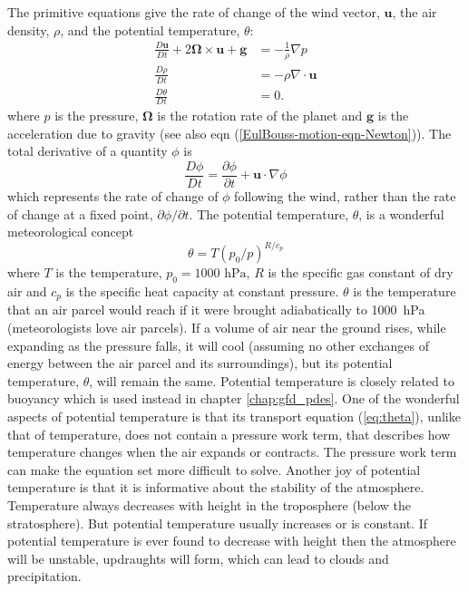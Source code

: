 The primitive equations give the rate of change of the wind vector,
$\mathbf{u}$, the air density, $\rho$, and the potential temperature,
$\theta$:
\begin{align}
\frac{D\mathbf{u}}{Dt}+2\bm{\Omega}\times\mathbf{u}+\mathbf{g} & =-\frac{1}{\rho}\nabla p\label{eq:mom}\\
\frac{D\rho}{Dt} & =-\rho\nabla\cdot\mathbf{u}\label{eq:cont}\\
\frac{D\theta}{Dt} & =0.\label{eq:theta}
\end{align}
where $p$ is the pressure, $\bm{\Omega}$ is the rotation rate of
the planet and $\mathbf{g}$ is the acceleration due to gravity (see also eqn (\ref{EulBouss-motion-eqn-Newton})).
The total derivative of a quantity $\phi$ is
\begin{equation}
\frac{D\phi}{Dt}=\frac{\partial\phi}{\partial t}+\mathbf{u}\cdot\nabla\phi\label{eq:linAdvect}
\end{equation}
which represents the rate of change of $\phi$ following the wind,
rather than the rate of change at a fixed point, $\partial\phi/\partial t$.
The potential temperature, $\theta$, is a wonderful meteorological
concept
\begin{equation}
\theta=T\left(p_{0}/p\right)^{R/c_{p}}
\end{equation}
where $T$ is the temperature, $p_{0}=1000\text{ hPa}$, $R$ is the
specific gas constant of dry air and $c_{p}$ is the specific heat
capacity at constant pressure. $\theta$ is the temperature that an
air parcel would reach if it were brought adiabatically to 1000~hPa
(meteorologists love air parcels). If a volume of air near the ground
rises, while expanding as the pressure falls, it will cool (assuming
no other exchanges of energy between the air parcel and its surroundings),
but its potential temperature, $\theta$, will remain the same. Potential temperature is closely related to buoyancy which is used instead in chapter \ref{chap:gfd_pdes}.
One of the wonderful aspects of potential temperature is that its
transport equation (\ref{eq:theta}), unlike that of temperature,
does not contain a pressure work term, that describes how temperature
changes when the air expands or contracts. The pressure work term
can make the equation set more difficult to solve. Another joy of
potential temperature is that it is informative about the stability
of the atmosphere. Temperature always decreases with height in the
troposphere (below the stratosphere). But potential temperature usually
increases or is constant. If potential temperature is ever found to
decrease with height then the atmosphere will be unstable, updraughts
will form, which can lead to clouds and precipitation.

